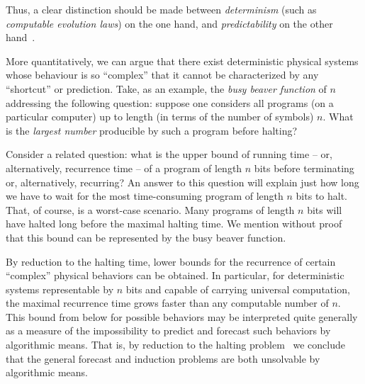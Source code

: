 Thus, a clear distinction should be made between {\em determinism} (such as {\em computable evolution laws})  on the one hand,
and {\em predictability} on the other hand~\cite{suppes-1993}.

More quantitatively, we can argue that there exist
deterministic physical systems whose behaviour is so ``complex'' that it cannot be characterized by any ``shortcut'' or prediction.
Take, as an example,
the {\em busy beaver function} \cite{rado,dewdney}
 of $n$
addressing the following
question: suppose one considers all  programs (on a particular computer)
up to length (in terms of the number of symbols) $n$.
What is the {\em largest number} producible by such a program before halting?

Consider a related question: what is the upper bound of running time  --  or,
alternatively, recurrence time  --  of a program of length $n$ bits before
terminating  or, alternatively, recurring?
An answer to this question will explain just how long we have to
wait for the most time-consuming program of length $n$ bits to
halt. That, of course, is a worst-case scenario. Many programs of
length $n$ bits will have halted long  before the maximal halting time.
We mention without proof \cite{chaitin-ACM,chaitin-bb}  that
this bound can be represented by the busy beaver function.


By reduction to the halting time, lower bounds for the recurrence of certain ``complex'' physical behaviors can be obtained.
In particular, for deterministic systems representable by $n$ bits and capable of carrying universal computation,
the maximal recurrence time grows faster than any computable number
of $n$.
This bound from below for possible behaviors may be interpreted quite generally
as a measure
of the impossibility to predict and forecast such behaviors by algorithmic means.
That is, by reduction to the halting problem~\cite{svozil-07-physical_unknowables}
we conclude that the general forecast and induction problems are both
unsolvable by algorithmic means.

\begin{center}
{\color{olive}   \Huge
\decofourright
}
\end{center}


